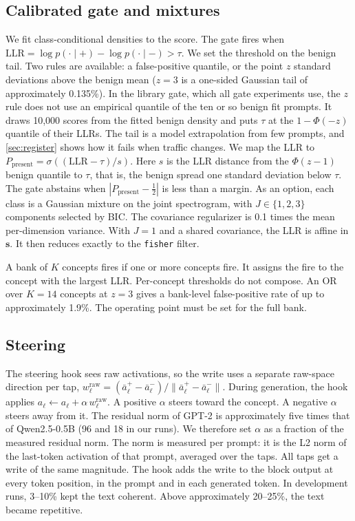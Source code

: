\documentclass[11pt]{article}
\newcommand{\raw}{\mathrm{raw}}
\newcommand{\LLR}{\mathrm{LLR}}
\begin{document}
\subsection{Calibrated gate and mixtures}
We fit class-conditional densities to the score. The gate fires when $\LLR = \log p(\cdot\mid +) - \log
p(\cdot\mid -) > \tau$. We set the threshold on the benign tail. Two rules are available: a false-positive
quantile, or the point $z$ standard deviations above the benign mean ($z=3$ is a one-sided Gaussian
tail of approximately 0.135\%). In the library gate, which all gate experiments use, the $z$ rule does not
use an empirical quantile of the ten or so benign fit prompts. It draws 10{,}000 scores from the fitted benign density and puts $\tau$ at the $1-\Phi(-z)$
quantile of their LLRs. The tail is a model extrapolation from few prompts, and \cref{sec:register}
shows how it fails when traffic changes. We map the LLR to $P_{\text{present}}=\sigma((\LLR-\tau)/s)$. Here $s$
is the LLR distance from the $\Phi(z-1)$ benign quantile to $\tau$, that is, the benign spread one standard deviation below
$\tau$. The gate abstains when $|P_{\text{present}}-\tfrac12|$ is less than a margin. As an option, each
class is a Gaussian mixture on the joint spectrogram, with $J\in\{1,2,3\}$ components selected by BIC. The
covariance regularizer is 0.1 times the mean per-dimension variance.
With $J=1$ and a shared covariance, the LLR is affine in $\mathbf{s}$. It then reduces exactly to the
\texttt{fisher} filter.

A bank of $K$ concepts fires if one or more concepts fire. It assigns the fire to the concept with the
largest LLR. Per-concept thresholds do not compose. An OR over $K=14$ concepts at $z=3$ gives a bank-level
false-positive rate of up to approximately 1.9\%. The operating point must be set for the full bank.

\subsection{Steering}
\label{sec:steering}
The steering hook sees raw activations, so the write uses a separate raw-space direction per tap,
$w^\raw_\ell = (\bar a^+_\ell - \bar a^-_\ell)/\lVert \bar a^+_\ell - \bar a^-_\ell\rVert$. During
generation, the hook applies $a_\ell \leftarrow a_\ell + \alpha\, w^\raw_\ell$. A positive $\alpha$ steers
toward the concept. A negative $\alpha$ steers away from it. The residual norm of GPT-2 is approximately
five times that of Qwen2.5-0.5B (96 and 18 in our runs). We therefore set $\alpha$ as a fraction of the measured residual norm. The norm is measured per prompt: it is the L2 norm of the last-token activation of
that prompt, averaged over the taps. All taps get a write of the same magnitude. The hook adds the write
to the block output at every token position, in the prompt and in each generated token.
In development runs, 3--10\% kept the text coherent. Above approximately 20--25\%,
the text became repetitive.
\end{document}
